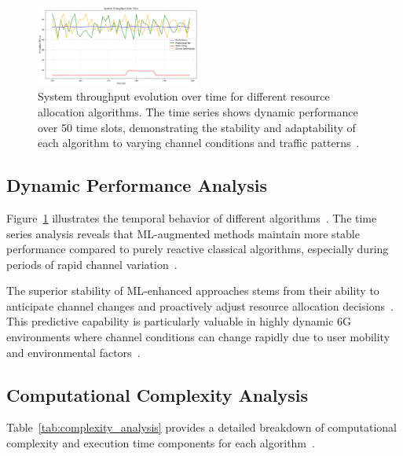 \documentclass[conference]{IEEEtran}
\begin{document}
\begin{figure}[!t]
    \centering
    \includegraphics[width=0.48\textwidth]{throughput_timeseries.png}
    \caption{System throughput evolution over time for different resource allocation algorithms. The time series shows dynamic performance over 50 time slots, demonstrating the stability and adaptability of each algorithm to varying channel conditions and traffic patterns~\cite{adaptive_algorithms}.}
    \label{fig:throughput_evolution}
\end{figure}

\subsection{Dynamic Performance Analysis}

Figure~\ref{fig:throughput_evolution} illustrates the temporal behavior of different algorithms~\cite{adaptive_algorithms}. The time series analysis reveals that ML-augmented methods maintain more stable performance compared to purely reactive classical algorithms, especially during periods of rapid channel variation~\cite{channel_estimation}.

The superior stability of ML-enhanced approaches stems from their ability to anticipate channel changes and proactively adjust resource allocation decisions~\cite{predictive_networking,proactive_allocation}. This predictive capability is particularly valuable in highly dynamic 6G environments where channel conditions can change rapidly due to user mobility and environmental factors~\cite{mobility_impact,environmental_effects}.

\subsection{Computational Complexity Analysis}

Table~\ref{tab:complexity_analysis} provides a detailed breakdown of computational complexity and execution time components for each algorithm~\cite{realtime_systems}.
\end{document}
